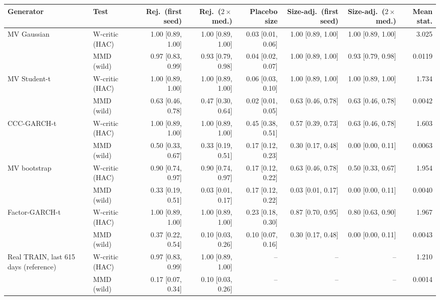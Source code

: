 \begin{tabular}{llrrrrrr}
\toprule
Generator & Test & Rej.\ (first seed) & Rej.\ ($2\times$med.) & Placebo size & Size-adj.\ (first seed) & Size-adj.\ ($2\times$med.) & Mean stat. \\
\midrule
MV Gaussian & W-critic (HAC) & 1.00 [0.89, 1.00] & 1.00 [0.89, 1.00] & 0.03 [0.01, 0.06] & 1.00 [0.89, 1.00] & 1.00 [0.89, 1.00] & 3.025 \\
 & MMD (wild) & 0.97 [0.83, 0.99] & 0.93 [0.79, 0.98] & 0.04 [0.02, 0.07] & 1.00 [0.89, 1.00] & 0.93 [0.79, 0.98] & 0.0119 \\
MV Student-t & W-critic (HAC) & 1.00 [0.89, 1.00] & 1.00 [0.89, 1.00] & 0.06 [0.03, 0.10] & 1.00 [0.89, 1.00] & 1.00 [0.89, 1.00] & 1.734 \\
 & MMD (wild) & 0.63 [0.46, 0.78] & 0.47 [0.30, 0.64] & 0.02 [0.01, 0.05] & 0.63 [0.46, 0.78] & 0.63 [0.46, 0.78] & 0.0042 \\
CCC-GARCH-t & W-critic (HAC) & 1.00 [0.89, 1.00] & 1.00 [0.89, 1.00] & 0.45 [0.38, 0.51] & 0.57 [0.39, 0.73] & 0.63 [0.46, 0.78] & 1.603 \\
 & MMD (wild) & 0.50 [0.33, 0.67] & 0.33 [0.19, 0.51] & 0.17 [0.12, 0.23] & 0.30 [0.17, 0.48] & 0.00 [0.00, 0.11] & 0.0063 \\
MV bootstrap & W-critic (HAC) & 0.90 [0.74, 0.97] & 0.90 [0.74, 0.97] & 0.17 [0.12, 0.22] & 0.63 [0.46, 0.78] & 0.50 [0.33, 0.67] & 1.954 \\
 & MMD (wild) & 0.33 [0.19, 0.51] & 0.03 [0.01, 0.17] & 0.17 [0.12, 0.22] & 0.03 [0.01, 0.17] & 0.00 [0.00, 0.11] & 0.0040 \\
Factor-GARCH-t & W-critic (HAC) & 1.00 [0.89, 1.00] & 1.00 [0.89, 1.00] & 0.23 [0.18, 0.30] & 0.87 [0.70, 0.95] & 0.80 [0.63, 0.90] & 1.967 \\
 & MMD (wild) & 0.37 [0.22, 0.54] & 0.10 [0.03, 0.26] & 0.10 [0.07, 0.16] & 0.30 [0.17, 0.48] & 0.00 [0.00, 0.11] & 0.0043 \\
Real TRAIN, last 615 days (reference) & W-critic (HAC) & 0.97 [0.83, 0.99] & 1.00 [0.89, 1.00] & -- & -- & -- & 1.210 \\
 & MMD (wild) & 0.17 [0.07, 0.34] & 0.10 [0.03, 0.26] & -- & -- & -- & 0.0014 \\
\bottomrule
\end{tabular}
